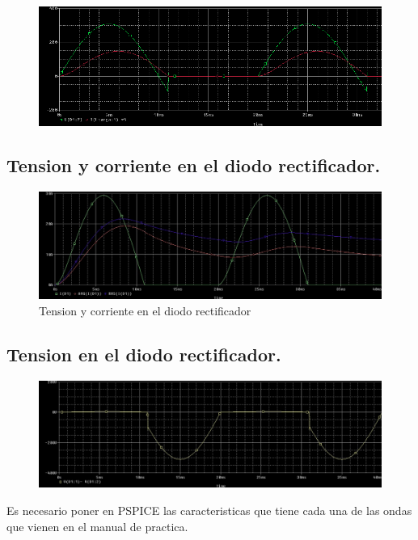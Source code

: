 \documentclass[11pt,a4paper]{article}
\begin{document}
\begin{figure}[h]
\centering
\includegraphics[scale=.4]{2.png} 
\end{figure}

\subsection{Tension y corriente en el diodo rectificador.}

\begin{figure}[h]
\centering
\includegraphics[scale=.4]{3.png} 
\caption{Tension y corriente en el diodo rectificador}
\end{figure}

\subsection{Tension en el diodo rectificador.}

\begin{figure}[h]
\centering
\includegraphics[scale=.4]{4.png}  
\end{figure}

Es necesario poner en PSPICE las caracteristicas que tiene cada una de las ondas que vienen en el manual de practica.
\end{document}
